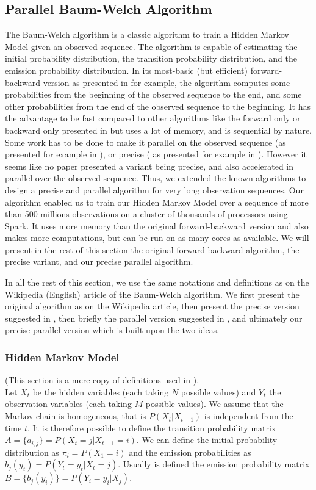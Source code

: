 \subsection{Parallel Baum-Welch Algorithm}
The Baum-Welch algorithm is a classic algorithm to train a Hidden Markov Model given an observed sequence. The algorithm is capable of estimating the initial probability distribution, the transition probability distribution, and the emission probability distribution.
In its most-basic (but efficient) forward-backward version as presented in \cite{rabiner1989tutorial} for example, the algorithm computes some probabilities from the beginning of the observed sequence to the end, and some other probabilities from the end of the observed sequence to the beginning. It has the advantage to be fast compared to other algorithms like the forward only or backward only presented in \cite{turin1998unidirectional} but uses a lot of memory, and is sequential by nature.
Some work has to be done to make it parallel on the observed sequence (as presented for example in \cite{turin1998unidirectional}), or precise ( as presented for example in \cite{rabiner1989tutorial}). However it seems like no paper presented a variant being precise, and also accelerated in parallel over the observed sequence.
Thus, we extended the known algorithms to design a precise and parallel algorithm for very long observation sequences.
Our algorithm enabled us to train our Hidden Markov Model over a sequence of more than 500 millions observations on a cluster of thousands of processors using Spark. It uses more memory than the original forward-backward version and also makes more computations, but can be run on as many cores as available.
We will present in the rest of this section the original forward-backward algorithm, the precise variant, and our precise parallel algorithm.

In all the rest of this section, we use the same notations and definitions as on the Wikipedia (English) article of the Baum-Welch algorithm. We first present the original algorithm as on the Wikipedia article, then present the precise version suggested in \cite{rabiner1989tutorial}, then briefly the parallel version suggested in \cite{turin1998unidirectional}, and ultimately our precise parallel version which is built upon the two ideas.

\subsubsection*{Hidden Markov Model}
(This section is a mere copy of definitions used in \cite{wiki:BaumWelch_algorithm}). \\
Let $X_t$ be the hidden variables (each taking $N$ possible values) and $Y_t$ the observation variables (each taking $M$ possible values). We assume that the Markov chain is homogeneous, that is $P(X_t|X_{t-1})$ is independent from the time $t$.
It is therefore possible to define the transition probability matrix $A = \{a_{i,j}\} = P(X_t = j | X_{t-1} = i)$.
We can define the initial probability distribution as $\pi_i = P(X_1=i)$ and the emission probabilities as $b_j(y_t) = P(Y_t = y_t | X_t = j)$. Usually is defined the emission probability matrix $B = \{b_j(y_i)\} = P(Y_i=y_i | X_j)$.

